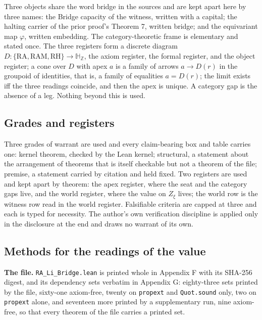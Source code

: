 \documentclass[10pt,twocolumn]{article}
\begin{document}
Three objects share the word bridge in the sources and are kept apart
here by three names: the Bridge capacity of the witness, written with a
capital; the halting carrier of the prior proof's Theorem 7, written
bridge; and the equivariant map \(\varphi\), written embedding. The
category-theoretic frame is elementary and stated once. The three
registers form a discrete diagram
\(D : \{\mathrm{RA}, \mathrm{RAM}, \mathrm{RH}\} \to \mathbb{H}_{\mathbb{Z}}\),
the axiom register, the formal register, and the object register; a cone
over \(D\) with apex \(a\) is a family of arrows \(a \to D(r)\) in the
groupoid of identities, that is, a family of equalities \(a = D(r)\);
the limit exists iff the three readings coincide, and then the apex is
unique. A category gap is the absence of a leg. Nothing beyond this is
used.

\hypertarget{grades-and-registers}{%
\subsection{Grades and registers}\label{grades-and-registers}}

Three grades of warrant are used and every claim-bearing box and table
carries one: kernel theorem, checked by the Lean kernel; structural, a
statement about the arrangement of theorems that is itself checkable but
not a theorem of the file; premise, a statement carried by citation and
held fixed. Two registers are used and kept apart by theorem: the apex
register, where the seat and the category gaps live, and the world
register, where the value on \(Z_\xi\) lives; the world row is the
witness row read in the world register. Falsifiable criteria are capped
at three and each is typed for necessity. The author's own verification
discipline is applied only in the disclosure at the end and draws no
warrant of its own.

\hypertarget{methods-for-the-readings-of-the-value}{%
\subsection{Methods for the readings of the
value}\label{methods-for-the-readings-of-the-value}}

\textbf{The file.} \texttt{RA\_Li\_Bridge.lean} is printed whole in
Appendix F with its SHA-256 digest, and its dependency sets verbatim in
Appendix G: eighty-three sets printed by the file, sixty-one axiom-free,
twenty on \texttt{propext} and \texttt{Quot.sound} only, two on
\texttt{propext} alone, and seventeen more printed by a supplementary
run, nine axiom-free, so that every theorem of the file carries a
printed set.
\end{document}
